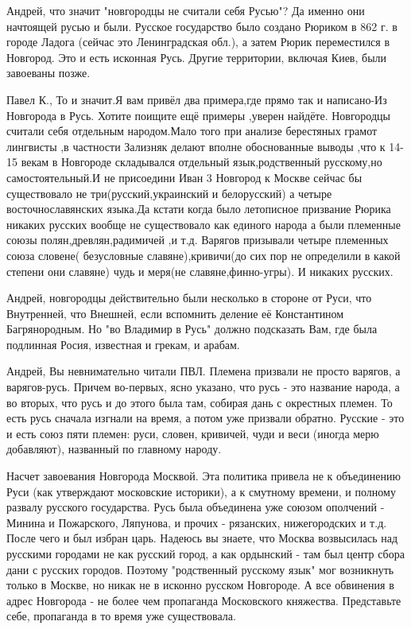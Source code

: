 \begin{itemize}

Андрей, что значит "новгородцы не считали себя Русью"? Да именно они начтоящей
русью и были. Русское государство было создано Рюриком в 862 г.
в городе Ладога (сейчас это Ленинградская обл.), а затем Рюрик
переместился в Новгород. Это и есть исконная Русь. Другие
территории, включая Киев, были завоеваны позже.




Павел К., То и значит.Я вам привёл два примера,где прямо так и написано-Из Новгорода в Русь. Хотите поищите ещё примеры ,уверен найдёте. Новгородцы считали себя отдельным народом.Мало того при анализе берестяных грамот лингвисты ,в частности Зализняк делают вполне обоснованные выводы ,что к 14-15 векам в Новгороде складывался отдельный язык,родственный русскому,но самостоятельный.И не присоедини Иван 3 Новгород к Москве сейчас бы существовало не три(русский,украинский и белорусский) а четыре восточнославянских языка.Да кстати когда было летописное призвание Рюрика никаких русских вообще не существовало как единого народа а были племенные союзы полян,древлян,радимичей ,и т.д. Варягов призывали четыре племенных союза словене( безусловные славяне),кривичи(до сих пор не определили в какой степени они славяне) чудь и меря(не славяне,финно-угры). И никаких русских.


Андрей, новгородцы действительно были несколько в стороне от Руси, что
Внутренней, что Внешней, если вспомнить деление её Константином Багрянородным.
Но "во Владимир в Русь" должно подсказать Вам, где была подлинная Росия,
известная и грекам, и арабам.


Андрей, Вы невнимательно читали ПВЛ. Племена призвали не просто варягов, а
варягов-русь. Причем во-первых, ясно указано, что русь - это название народа, а
во вторых, что русь и до этого была там, собирая дань с окрестных племен. То
есть русь сначала изгнали на время, а потом уже призвали обратно. Русские - это
и есть союз пяти племен: руси, словен, кривичей, чуди и веси (иногда мерю
добавляют), названный по главному народу.

Насчет завоевания Новгорода Москвой. Эта политика привела не к объединению Руси
(как утверждают московские историки), а к смутному времени, и полному развалу
русского государства. Русь была объединена уже союзом ополчений - Минина и
Пожарского, Ляпунова, и прочих - рязанских, нижегородских и т.д. После чего и
был избран царь. Надеюсь вы знаете, что Москва возвысилась над русскими
городами не как русский город, а как ордынский - там был центр сбора дани с
русских городов. Поэтому "родственный русскому язык" мог возникнуть только в
Москве, но никак не в исконно русском Новгороде. А все обвинения в адрес
Новгорода - не более чем пропаганда Московского княжества. Представьте себе,
пропаганда в то время уже существовала.


\end{itemize}
